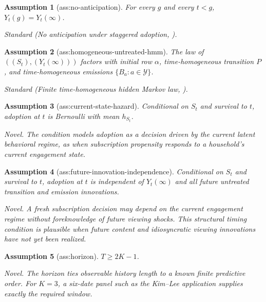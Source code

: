 \documentclass{article}
\newtheorem{assumption}{Assumption}
\begin{document}
\begin{assumption}[ass:no-anticipation]\label{ass:no-anticipation}
For every \(g\) and every \(t<g\), \(Y_t(g)=Y_t(\infty)\).
\par\smallskip\noindent\emph{Standard} (No anticipation under staggered adoption, \cite{CallawaySantAnna2021DiD}).
\end{assumption}

\begin{assumption}[ass:homogeneous-untreated-hmm]\label{ass:homogeneous-untreated-hmm}
The law of \(((S_t),(Y_t(\infty)))\) factors with initial row \(\alpha\), time-homogeneous transition \(P\), and time-homogeneous emissions \(\{B_a:a\in\mathcal Y\}\).
\par\smallskip\noindent\emph{Standard} (Finite time-homogeneous hidden Markov law, \cite{HsuKakadeZhang2012SpectralHMM}).
\end{assumption}

\begin{assumption}[ass:current-state-hazard]\label{ass:current-state-hazard}
Conditional on \(S_t\) and survival to \(t\), adoption at \(t\) is Bernoulli with mean \(h_{S_t}\).
\par\smallskip\noindent\emph{Novel.} The condition models adoption as a decision driven by the current latent behavioral regime, as when subscription propensity responds to a household's current engagement state.
\end{assumption}

\begin{assumption}[ass:future-innovation-independence]\label{ass:future-innovation-independence}
Conditional on \(S_t\) and survival to \(t\), adoption at \(t\) is independent of \(Y_t(\infty)\) and all future untreated transition and emission innovations.
\par\smallskip\noindent\emph{Novel.} A fresh subscription decision may depend on the current engagement regime without foreknowledge of future viewing shocks. This structural timing condition is plausible when future content and idiosyncratic viewing innovations have not yet been realized.
\end{assumption}

\begin{assumption}[ass:horizon]\label{ass:horizon}
\(T\ge 2K-1\).
\par\smallskip\noindent\emph{Novel.} The horizon ties observable history length to a known finite predictive order. For \(K=3\), a six-date panel such as the Kim--Lee application supplies exactly the required window.
\end{assumption}
\end{document}
